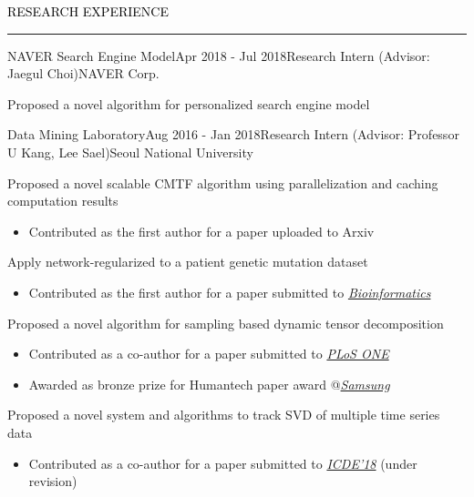 \documentclass{resume} %
\renewenvironment{rSection}[1]{
	\sectionskip
	\textcolor{Black}{\MakeUppercase{#1}}
	\sectionlineskip
	\hrule
	\begin{list}{}{
			\setlength{\leftmargin}{1.5em}
		}
		\item[]
	}{
	\end{list}
}
\begin{document}
\vspace*{-2.0mm}
\begin{rSection}{Research Experience}
\begin{rSubsection}{NAVER Search Engine Model}{Apr 2018 - Jul 2018}{Research Intern (Advisor: Jaegul Choi)}{NAVER Corp.}
	\item Proposed a novel algorithm for personalized search engine model
\end{rSubsection}	
\vspace*{-2.5mm}
\begin{rSubsection}{Data Mining Laboratory}{Aug 2016 - Jan 2018}{Research Intern (Advisor: Professor U Kang, Lee Sael)}{Seoul National University}
	\item Proposed a novel scalable CMTF algorithm using parallelization and caching computation results
	\begin{itemize}
		\vspace*{-2.5mm}
		\item Contributed as the first author for a paper uploaded to Arxiv
	\end{itemize}
	\item Apply network-regularized to a patient genetic mutation dataset
	\begin{itemize}
		\vspace*{-2.0mm}
		\item Contributed as the first author for a paper submitted to \href{https://academic.oup.com/bioinformatics}{\textit{Bioinformatics}}
	\end{itemize}
	\item Proposed a novel algorithm for sampling based dynamic tensor decomposition
	\begin{itemize}
		\vspace*{-2.0mm}
		\item Contributed as a co-author for a paper submitted to \href{http://journals.plos.org/plosone/}{\textit{PLoS ONE}}
		\vspace*{-2.0mm}
		\item Awarded as bronze prize for Humantech paper award @\em{\href{https://humantech.samsung.com/saitext/index.jsp}{Samsung}}\em
	\end{itemize}
	\item Proposed a novel system and algorithms to track SVD of multiple time series data
	\begin{itemize}
		\vspace*{-2.0mm}
		\item Contributed as a co-author for a paper submitted to \href{https://icde2018.org/}{\textit{ICDE'18}} (under revision)

\end{itemize}
\end{rSubsection}
\end{rSection}
\end{document}
